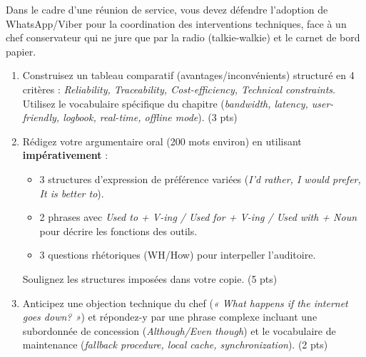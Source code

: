\documentclass[11pt]{article}
\begin{document}
\begin{exercice}
Dans le cadre d'une réunion de service, vous devez défendre l'adoption de WhatsApp/Viber pour la coordination des interventions techniques, face à un chef conservateur qui ne jure que par la radio (talkie-walkie) et le carnet de bord papier.

\begin{enumerate}
    \item Construisez un tableau comparatif (avantages/inconvénients) structuré en 4 critères : \textit{Reliability, Traceability, Cost-efficiency, Technical constraints}. Utilisez le vocabulaire spécifique du chapitre (\textit{bandwidth, latency, user-friendly, logbook, real-time, offline mode}). (3 pts)
    \item Rédigez votre argumentaire oral (200 mots environ) en utilisant \textbf{impérativement} :
    \begin{itemize}
        \item 3 structures d'expression de préférence variées (\textit{I'd rather, I would prefer, It is better to}).
        \item 2 phrases avec \textit{Used to + V-ing / Used for + V-ing / Used with + Noun} pour décrire les fonctions des outils.
        \item 3 questions rhétoriques (WH/How) pour interpeller l'auditoire.
    \end{itemize}
    Soulignez les structures imposées dans votre copie. (5 pts)
    \item Anticipez une objection technique du chef (\textit{« What happens if the internet goes down? »}) et répondez-y par une phrase complexe incluant une subordonnée de concession (\textit{Although/Even though}) et le vocabulaire de maintenance (\textit{fallback procedure, local cache, synchronization}). (2 pts)
\end{enumerate}
\end{exercice}
\end{document}
